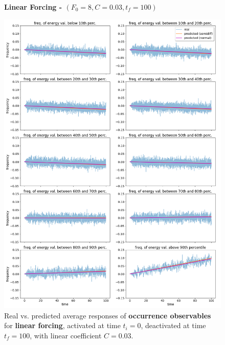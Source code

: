 \documentclass{article}
\begin{document}
\begin{figure}[!h]
	\centering
	\textbf{Linear Forcing - $(F_0=8, C=0.03, t_f=100)$}\par\medskip
	\includegraphics[width=0.9\linewidth]{fig/pred_bin_L_003_100.png}
	\caption{Real vs. predicted average responses of \textbf{occurrence observables} for \textbf{linear forcing}, activated at time $t_i=0$, deactivated at time $t_f=100$, with linear coefficient $C=0.03$.}
	\label{fig:pred_bin_L_003_100}
\end{figure}
\end{document}
